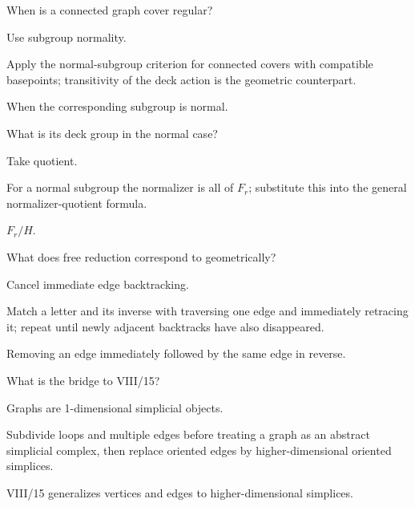 \begin{exercise}\label{exr:viii14-21}
When is a connected graph cover regular?
\end{exercise}
\begin{hint}
Use subgroup normality.

Apply the normal-subgroup criterion for connected covers with compatible basepoints; transitivity of the deck action is the geometric counterpart.
\end{hint}
\begin{solution}
When the corresponding subgroup is normal.
\end{solution}

\begin{exercise}\label{exr:viii14-22}
What is its deck group in the normal case?
\end{exercise}
\begin{hint}
Take quotient.

For a normal subgroup the normalizer is all of \(F_r\); substitute this into the general normalizer-quotient formula.
\end{hint}
\begin{solution}
\(F_r/H\).
\end{solution}

\begin{exercise}\label{exr:viii14-23}
What does free reduction correspond to geometrically?
\end{exercise}
\begin{hint}
Cancel immediate edge backtracking.

Match a letter and its inverse with traversing one edge and immediately retracing it; repeat until newly adjacent backtracks have also disappeared.
\end{hint}
\begin{solution}
Removing an edge immediately followed by the same edge in reverse.
\end{solution}

\begin{exercise}\label{exr:viii14-24}
What is the bridge to VIII/15?
\end{exercise}
\begin{hint}
Graphs are 1-dimensional simplicial objects.

Subdivide loops and multiple edges before treating a graph as an abstract simplicial complex, then replace oriented edges by higher-dimensional oriented simplices.
\end{hint}
\begin{solution}
VIII/15 generalizes vertices and edges to higher-dimensional simplices.
\end{solution}



